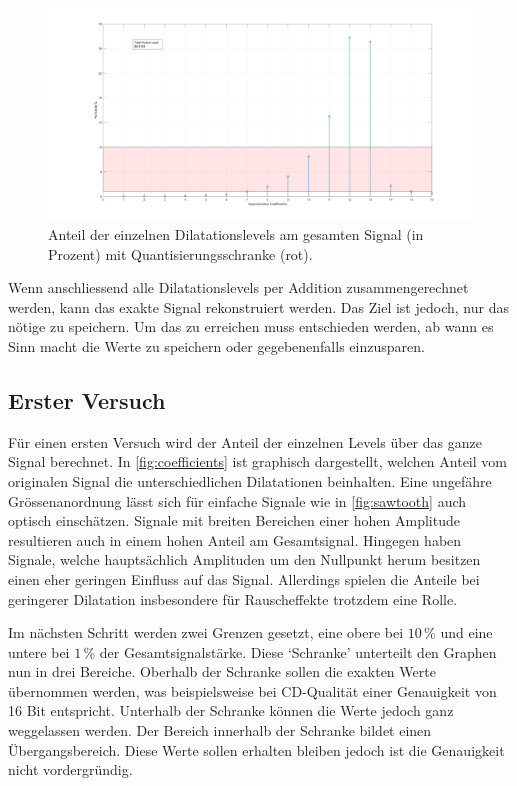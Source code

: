 \begin{refsection}
\begin{figure}
	\centering
	\includegraphics[width=\linewidth]{papers/compress/Bilder/recCoefs}
	\caption{Anteil der einzelnen Dilatationslevels am gesamten Signal (in Prozent) mit Quantisierungsschranke (rot).}
	\label{fig:coefficients}
\end{figure} 

Wenn anschliessend alle Dilatationslevels per Addition zusammengerechnet werden, kann das exakte Signal rekonstruiert werden.
Das Ziel ist jedoch, nur das nötige zu speichern.
Um das zu erreichen muss entschieden werden, ab wann es Sinn macht die Werte zu speichern oder gegebenenfalls einzusparen.

\subsection{Erster Versuch}
Für einen ersten Versuch wird der Anteil der einzelnen Levels über das ganze Signal berechnet.
In \autoref{fig:coefficients} ist graphisch dargestellt, welchen Anteil vom originalen Signal die unterschiedlichen Dilatationen beinhalten.
Eine ungefähre Grössenanordnung lässt sich für einfache Signale wie in \autoref{fig:sawtooth} auch optisch einschätzen.
Signale mit breiten Bereichen einer hohen Amplitude resultieren auch in einem hohen Anteil am Gesamtsignal. 
Hingegen haben Signale, welche hauptsächlich Amplituden um den Nullpunkt herum besitzen einen eher geringen Einfluss auf das Signal.
Allerdings spielen die Anteile bei geringerer Dilatation insbesondere für Rauscheffekte trotzdem eine Rolle.

Im nächsten Schritt werden zwei Grenzen gesetzt,
eine obere bei  $10\,\text{\%}$ und eine untere bei $1\,\text{\%}$ der Gesamtsignalstärke.
Diese `Schranke' unterteilt den Graphen nun in drei Bereiche. 
Oberhalb der Schranke sollen die exakten Werte übernommen werden, was beispielsweise bei CD-Qualität einer Genauigkeit von 16 Bit entspricht.
Unterhalb der Schranke können die Werte jedoch ganz weggelassen werden.
Der Bereich innerhalb der Schranke bildet einen Übergangsbereich.
Diese Werte sollen erhalten bleiben jedoch ist die Genauigkeit nicht vordergründig.


\end{refsection}
